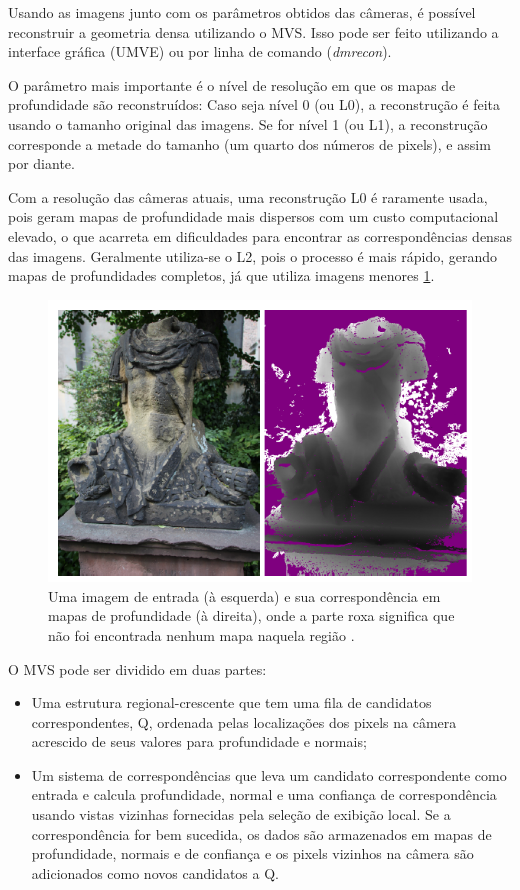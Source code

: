 Usando as imagens junto com os parâmetros obtidos das câmeras, é possível reconstruir a geometria densa utilizando o MVS. Isso pode ser feito utilizando a interface gráfica (UMVE) ou por linha de comando (\emph{dmrecon}).

O parâmetro mais importante é o nível de resolução em que os mapas de profundidade são reconstruídos: Caso seja nível 0 (ou L0), a reconstrução é feita usando o tamanho original das imagens. Se for nível 1 (ou L1), a reconstrução corresponde a metade do tamanho (um quarto dos números de pixels), e assim por diante.

Com a resolução das câmeras atuais, uma reconstrução L0 é raramente usada, pois geram mapas de profundidade mais dispersos com um custo computacional elevado, o que acarreta em dificuldades para encontrar as correspondências densas das imagens. Geralmente utiliza-se o L2, pois o processo é mais rápido, gerando mapas de profundidades completos, já que utiliza imagens menores \ref{fig:mvedepth}.

\begin{figure}[!h]
	\centering
	\includegraphics[width=0.4\linewidth]{figs/mvedepth.png}
	\caption{%
	Uma imagem de entrada (à esquerda) e sua correspondência em mapas de profundidade (à direita), onde a parte roxa significa que não foi encontrada nenhum mapa naquela região \protect\cite{mve}.
	}\label{fig:mvedepth}
\end{figure}

O MVS pode ser dividido em duas partes:
\begin{itemize}
\item {Uma estrutura regional-crescente que tem uma fila de candidatos correspondentes, Q, ordenada pelas localizações dos pixels na câmera acrescido de seus valores para profundidade e normais;}
\item {Um sistema de correspondências que leva um candidato correspondente como entrada e calcula profundidade, normal e uma confiança de correspondência usando vistas vizinhas fornecidas pela seleção de exibição local. Se a correspondência for bem sucedida, os dados são armazenados em mapas de profundidade, normais e de confiança e os pixels vizinhos na câmera são adicionados como novos candidatos a Q.}
\end{itemize}

